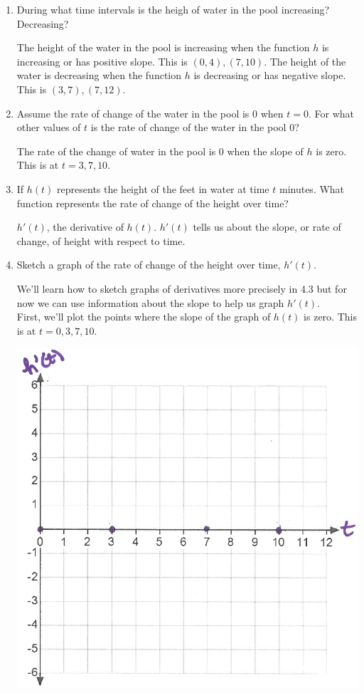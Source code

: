\documentclass[nooutcomes]{ximera}
\begin{document}
\begin{problem}
	\begin{enumerate}
		\item During what time intervals is the heigh of water in the pool increasing? Decreasing?
			\begin{freeResponse}
			The height of the water in the pool is increasing when the function $h$ is increasing or has positive slope.  This is $(0,4),(7,10)$.  The height of the water is decreasing when the function $h$ is decreasing or has negative slope.  This is $(3,7),(7,12)$.
			\end{freeResponse}
		\item  Assume the rate of change of the water in the pool is $0$ when $t=0$.  For what other values of $t$ is the rate of change of the water in the pool $0$?
			\begin{freeResponse}
			The rate of the change of water in the pool is $0$ when the slope of $h$ is zero.  This is at $t=3,7,10$.
			\end{freeResponse}
		\item If $h(t)$ represents the height of the feet in water at time $t$ minutes.  What function represents the rate of change of the height over time?
			\begin{freeResponse}
				$h'(t)$, the derivative of $h(t)$.  $h'(t)$ tells us about the slope, or rate of change, of height with respect to time.
			\end{freeResponse}
		\item Sketch a graph of the rate of change of the height over time, $h'(t)$.
			\begin{freeResponse}
			We'll learn how to sketch graphs of derivatives more precisely in 4.3 but for now we can use information about the slope to help us graph $h'(t)$.\\
			First, we'll plot the points where the slope of the graph of $h(t)$ is zero.  This is at $t=0,3,7,10$.
			\begin{image}
			\includegraphics[scale=.4]{Figure10.png}

\end{image}
\end{freeResponse}
\end{enumerate}
\end{problem}
\end{document}
